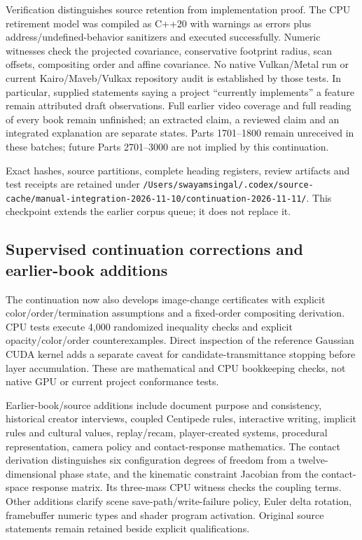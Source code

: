 Verification distinguishes source retention from implementation proof. The CPU retirement model was compiled as C++20 with warnings as errors plus address/undefined-behavior sanitizers and executed successfully. Numeric witnesses check the projected covariance, conservative footprint radius, scan offsets, compositing order and affine covariance. No native Vulkan/Metal run or current Kairo/Maveb/Vulkax repository audit is established by those tests. In particular, supplied statements saying a project ``currently implements'' a feature remain attributed draft observations. Full earlier video coverage and full reading of every book remain unfinished; an extracted claim, a reviewed claim and an integrated explanation are separate states. Parts 1701--1800 remain unreceived in these batches; future Parts 2701--3000 are not implied by this continuation.

Exact hashes, source partitions, complete heading registers, review artifacts and test receipts are retained under \texttt{/Users/swayamsingal/.codex/source-cache/manual-integration-2026-11-10/continuation-2026-11-11/}. This checkpoint extends the earlier corpus queue; it does not replace it.

\subsection{Supervised continuation corrections and earlier-book additions}\label{appendix-3b67654799a2-supervised-continuation-corrections-and-earlier-book-additions}

The continuation now also develops image-change certificates with explicit color/order/termination assumptions and a fixed-order compositing derivation. CPU tests execute 4,000 randomized inequality checks and explicit opacity/color/order counterexamples. Direct inspection of the reference Gaussian CUDA kernel adds a separate caveat for candidate-transmittance stopping before layer accumulation. These are mathematical and CPU bookkeeping checks, not native GPU or current project conformance tests.

Earlier-book/source additions include document purpose and consistency, historical creator interviews, coupled Centipede rules, interactive writing, implicit rules and cultural values, replay/recam, player-created systems, procedural representation, camera policy and contact-response mathematics. The contact derivation distinguishes six configuration degrees of freedom from a twelve-dimensional phase state, and the kinematic constraint Jacobian from the contact-space response matrix. Its three-mass CPU witness checks the coupling terms. Other additions clarify scene save-path/write-failure policy, Euler delta rotation, framebuffer numeric types and shader program activation. Original source statements remain retained beside explicit qualifications.

